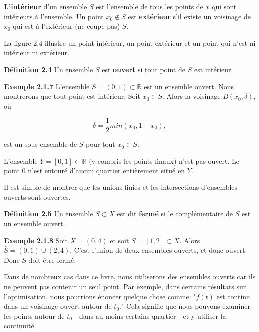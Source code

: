 \documentclass[11pt,twoside,a4paper]{article}
\begin{document}
\textbf{L'intérieur} d'un ensemble $S$ est l'ensemble de tous les points de $x$ qui sont intérieurs à l'ensemble. Un point $x_0  \notin S$ est \textbf{extérieur} s'il existe un voisinage de $x_0$ qui est à l'extérieur (ne coupe pas) $S$.

La figure 2.4 illustre un point intérieur, un point extérieur et un point qui n'est ni intérieur ni extérieur.



\textbf{Définition 2.4} Un ensemble $S$ est \textbf{ouvert} si tout point de $S$ est intérieur.

\textbf{Exemple 2.1.7} L'ensemble $S = (0, 1) \subset \mathbb{R}$ est un ensemble ouvert. Nous montrerons que tout point est intérieur. Soit $x_0 \in S$. Alors la voisinage $B(x_0, \delta)$, où

\begin{equation*}
  \delta = \frac{1}{2} min(x_0, 1 - x_0),
\end{equation*}

est un sous-ensemble de $S$ pour tout $x_0 \in S$.

L'ensemble $Y = [0, 1] \subset \mathbb{R}$ (y compris les points finaux) n'est pas ouvert. Le point 0 n'est entouré d'aucun quartier entièrement situé en $Y$.

Il est simple de montrer que les unions finies et les intersections d'ensembles ouverts sont ouvertes.

\textbf{Définition 2.5} Un ensemble $S \subset X$ est dit \textbf{fermé} si le complémentaire de $S$ est un ensemble ouvert.

\textbf{Exemple 2.1.8} Soit $X = (0, 4)$ et soit $S = [1, 2] \subset X$. Alors $\bar{S} = (0,1) \cup (2, 4)$. C'est l'union de deux ensembles ouverts, et donc ouvert. Donc $S$ doit être fermé.

Dans de nombreux cas dans ce livre, nous utiliserons des ensembles ouverts car ils ne peuvent pas contenir un seul point. Par exemple, dans certains résultats sur l'optimisation, nous pourrions énoncer quelque chose comme: "$f(t)$ est continu dans un voisinage ouvert autour de $t_0$." 
Cela signifie que nous pouvons examiner les points autour de $t_0$ - dans au moins certains quartier - et y utiliser la continuité.
\end{document}
